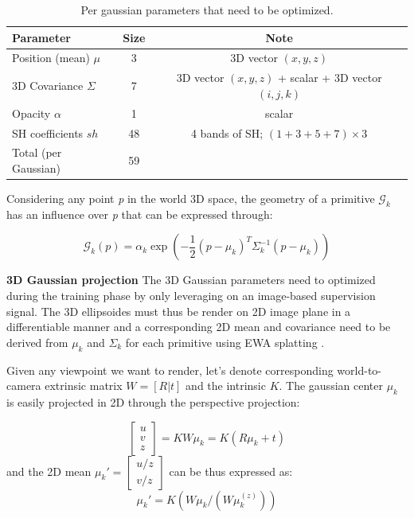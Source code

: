 \begin{table}[h!]
  \centering
  \begin{tabular}{lcc}
  \hline
  Parameter  & Size & Note \\
  \hline
  Position (mean)  $\mu$ & 3 & 3D vector $(x, y, z)$ \\
  3D Covariance $\Sigma$ & 7 & 3D vector $(x, y, z)$ + scalar + 3D vector  $(i, j, k)$\\
  Opacity  $\alpha$ & 1 & scalar \\
  SH coefficients  $sh$ & 48 & 4 bands of SH; $(1+3+5+7)\times3$ \\
  \hline
  Total (per Gaussian)  & 59 & \\
  \hline
  \end{tabular}
  \caption{Per gaussian parameters that need to be optimized.}
  \label{tab:gauss-param}
\end{table}

Considering any point \textit{p} in the world 3D space, the geometry of a primitive $\mathcal{G}_{k}$ has an influence over \textit{p} that can be expressed through: 

\begin{equation}
  \mathcal{G}_{k}(p) = \alpha_{k}\exp(-\frac{1}{2}(p-\mu_{k})^{T}\Sigma_{k}^{-1}(p-\mu_{k}))
\end{equation}

\noindent \textbf{3D Gaussian projection} The 3D Gaussian parameters need to optimized during the training phase by only leveraging on an image-based supervision signal. The 3D ellipsoides must thus be render on 2D image plane in a differentiable manner and a corresponding 2D mean and covariance need to be derived from $\mu_{k}$ and $\Sigma_{k}$ for each primitive using EWA splatting \citep{zwicker2001ewa}. 

Given any viewpoint we want to render, let's denote corresponding world-to-camera extrinsic matrix $W=[R|t]$ and the intrinsic $K$. The gaussian center $\mu_{k}$ is easily projected in 2D through the perspective projection: 

\begin{equation}
  \begin{bmatrix}
    u \\
    v \\
    z
  \end{bmatrix} = KW\mu_{k} = K(R\mu_{k}+t)
\end{equation}
and the 2D mean $\mu_{k}' = \begin{bmatrix}
  u/z \\
  v/z
\end{bmatrix}$ can be  thus expressed as:
\begin{equation}
  \mu_{k}' = K(W\mu_{k}/(W\mu_{k}^{(z)}))
\end{equation}


